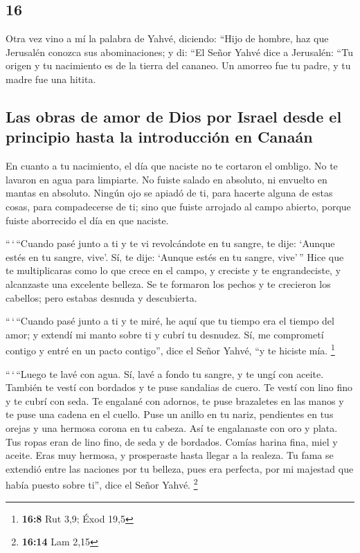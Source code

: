 \begin{paracol}{2}
\hypertarget{section-30}{%
\section{16}\label{section-30}}

 Otra vez vino a mí la palabra de Yahvé, diciendo:
 ``Hijo de hombre, haz que Jerusalén conozca sus
abominaciones;  y di: ``El Señor Yahvé dice a Jerusalén:
``Tu origen y tu nacimiento es de la tierra del cananeo. Un amorreo fue
tu padre, y tu madre fue una hitita.

\hypertarget{las-obras-de-amor-de-dios-por-israel-desde-el-principio-hasta-la-introducciuxf3n-en-canauxe1n}{%
\subsection{Las obras de amor de Dios por Israel desde el principio
hasta la introducción en
Canaán}\label{las-obras-de-amor-de-dios-por-israel-desde-el-principio-hasta-la-introducciuxf3n-en-canauxe1n}}

 En cuanto a tu nacimiento, el día que naciste no te
cortaron el ombligo. No te lavaron en agua para limpiarte. No fuiste
salado en absoluto, ni envuelto en mantas en absoluto. 
Ningún ojo se apiadó de ti, para hacerte alguna de estas cosas, para
compadecerse de ti; sino que fuiste arrojado al campo abierto, porque
fuiste aborrecido el día en que naciste.

 ``\,`\,``Cuando pasé junto a ti y te vi revolcándote en
tu sangre, te dije: `Aunque estés en tu sangre, vive'. Sí, te dije:
`Aunque estés en tu sangre, vive'\,''  Hice que te
multiplicaras como lo que crece en el campo, y creciste y te
engrandeciste, y alcanzaste una excelente belleza. Se te formaron los
pechos y te crecieron los cabellos; pero estabas desnuda y descubierta.

 ``\,`\,``Cuando pasé junto a ti y te miré, he aquí que tu
tiempo era el tiempo del amor; y extendí mi manto sobre ti y cubrí tu
desnudez. Sí, me comprometí contigo y entré en un pacto contigo'', dice
el Señor Yahvé, ``y te hiciste mía. \footnote{\textbf{16:8} Rut 3,9;
  Éxod 19,5}

 ``\,`\,``Luego te lavé con agua. Sí, lavé a fondo tu
sangre, y te ungí con aceite.  También te vestí con
bordados y te puse sandalias de cuero. Te vestí con lino fino y te cubrí
con seda.  Te engalané con adornos, te puse brazaletes en
las manos y te puse una cadena en el cuello.  Puse un
anillo en tu nariz, pendientes en tus orejas y una hermosa corona en tu
cabeza.  Así te engalanaste con oro y plata. Tus ropas
eran de lino fino, de seda y de bordados. Comías harina fina, miel y
aceite. Eras muy hermosa, y prosperaste hasta llegar a la realeza.
 Tu fama se extendió entre las naciones por tu belleza,
pues era perfecta, por mi majestad que había puesto sobre ti'', dice el
Señor Yahvé. \footnote{\textbf{16:14} Lam 2,15}


\end{paracol}
